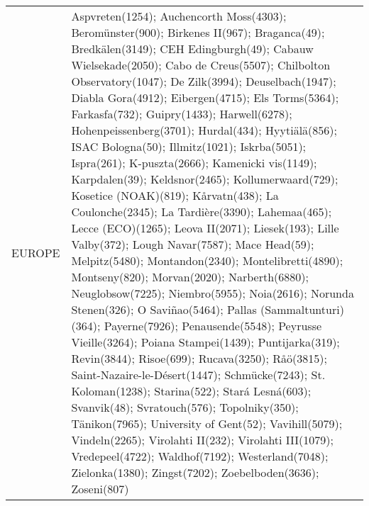 \documentclass[journal abbreviation, manuscript]{copernicus}
\begin{document}
\begin{table}
\begin{tabularx}{\textwidth}{lX}
   EUROPE &                                                                                                                                                                                                                                                                                                                                                                                                                                                                                                                                                                                                                                                                                                                                                                                                                                                                                                                                                                                                                                                                                                                                                                                                                                                                                                                                                                                  Aspvreten(1254); Auchencorth Moss(4303); Beromünster(900); Birkenes II(967); Braganca(49); Bredkälen(3149); CEH Edingburgh(49); Cabauw Wielsekade(2050); Cabo de Creus(5507); Chilbolton Observatory(1047); De Zilk(3994); Deuselbach(1947); Diabla Gora(4912); Eibergen(4715); Els Torms(5364); Farkasfa(732); Guipry(1433); Harwell(6278); Hohenpeissenberg(3701); Hurdal(434); Hyytiälä(856); ISAC Bologna(50); Illmitz(1021); Iskrba(5051); Ispra(261); K-puszta(2666); Kamenicki vis(1149); Karpdalen(39); Keldsnor(2465); Kollumerwaard(729); Kosetice (NOAK)(819); Kårvatn(438); La Coulonche(2345); La Tardière(3390); Lahemaa(465); Lecce (ECO)(1265); Leova II(2071); Liesek(193); Lille Valby(372); Lough Navar(7587); Mace Head(59); Melpitz(5480); Montandon(2340); Montelibretti(4890); Montseny(820); Morvan(2020); Narberth(6880); Neuglobsow(7225); Niembro(5955); Noia(2616); Norunda Stenen(326); O Saviñao(5464); Pallas (Sammaltunturi)(364); Payerne(7926); Penausende(5548); Peyrusse Vieille(3264); Poiana Stampei(1439); Puntijarka(319); Revin(3844); Risoe(699); Rucava(3250); Råö(3815); Saint-Nazaire-le-Désert(1447); Schmücke(7243); St. Koloman(1238); Starina(522); Stará Lesná(603); Svanvik(48); Svratouch(576); Topolniky(350); Tänikon(7965); University of Gent(52); Vavihill(5079); Vindeln(2265); Virolahti II(232); Virolahti III(1079); Vredepeel(4722); Waldhof(7192); Westerland(7048); Zielonka(1380); Zingst(7202); Zoebelboden(3636); Zoseni(807) \\

\end{tabularx}
\end{table}
\end{document}
